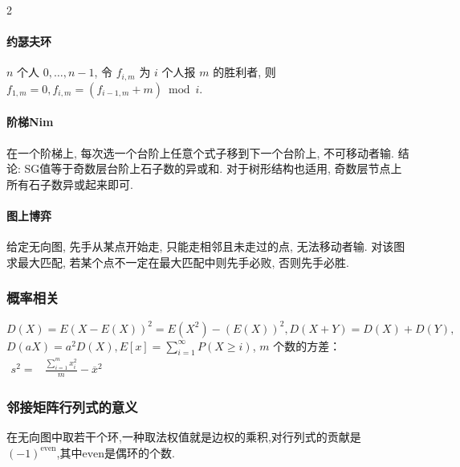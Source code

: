 \begin{footnotesize}
\begin{multicols}{2}
\paragraph{约瑟夫环}$n$ 个人 $0,\dots,n-1$, 令 $f_{i,m}$ 为 $i$ 个人报 $m$ 的胜利者, 则 $f_{1,m}=0,f_{i,m}=(f_{i-1,m}+m)\bmod i$. 
\paragraph{阶梯Nim} 在一个阶梯上, 每次选一个台阶上任意个式子移到下一个台阶上, 不可移动者输. 结论: SG值等于奇数层台阶上石子数的异或和. 对于树形结构也适用, 奇数层节点上所有石子数异或起来即可.
\paragraph{图上博弈} 给定无向图, 先手从某点开始走, 只能走相邻且未走过的点, 无法移动者输. 对该图求最大匹配, 若某个点不一定在最大匹配中则先手必败, 否则先手必胜.
\end{multicols}


\subsubsection{概率相关}
$D(X)=E(X-E(X))^2=E(X^2)-(E(X))^2,D(X+Y)=D(X)+D(Y),$\\
$D(aX)=a^2D(X), E[x]=\sum_{i=1}^{\infty}P(X\geq i)$, $m$ 个数的方差：$\begin{aligned}s^2=&\frac{\sum_{i=1}^m x_i^2}m-\overline x^2\end{aligned}$

\subsubsection{邻接矩阵行列式的意义}
在无向图中取若干个环,一种取法权值就是边权的乘积,对行列式的贡献是$(-1)^{\mathrm{even}}$,其中$\mathrm{even}$是偶环的个数.


\end{footnotesize}
